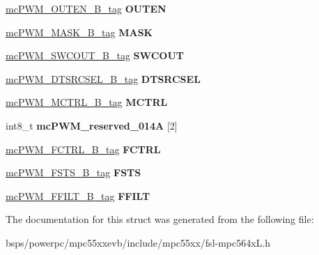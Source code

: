 \begin{DoxyCompactItemize}
\begin{tabbing}
\end{tabbing}\item 
\mbox{\label{structmcPWM__struct__tag_ae2bf17dbd74b854e60cd3dc3db4a5676}} 
\mbox{\hyperlink{unionmcPWM__OUTEN__16B__tag}{mc\+P\+W\+M\+\_\+\+O\+U\+T\+E\+N\+\_\+B\+\_\+tag}} {\bfseries O\+U\+T\+EN}
\item 
\mbox{\label{structmcPWM__struct__tag_a1a2abee4df185d8a016b06ce2971d1ea}} 
\mbox{\hyperlink{unionmcPWM__MASK__16B__tag}{mc\+P\+W\+M\+\_\+\+M\+A\+S\+K\+\_\+B\+\_\+tag}} {\bfseries M\+A\+SK}
\item 
\mbox{\label{structmcPWM__struct__tag_aa23d30471a0997e8ae2674ade1169375}} 
\mbox{\hyperlink{unionmcPWM__SWCOUT__16B__tag}{mc\+P\+W\+M\+\_\+\+S\+W\+C\+O\+U\+T\+\_\+B\+\_\+tag}} {\bfseries S\+W\+C\+O\+UT}
\item 
\mbox{\label{structmcPWM__struct__tag_a5839e29a4f5dd83b5464e1ab6d1b8a1e}} 
\mbox{\hyperlink{unionmcPWM__DTSRCSEL__16B__tag}{mc\+P\+W\+M\+\_\+\+D\+T\+S\+R\+C\+S\+E\+L\+\_\+B\+\_\+tag}} {\bfseries D\+T\+S\+R\+C\+S\+EL}
\item 
\mbox{\label{structmcPWM__struct__tag_afeedea5e1d9727884944d54446654329}} 
\mbox{\hyperlink{unionmcPWM__MCTRL__16B__tag}{mc\+P\+W\+M\+\_\+\+M\+C\+T\+R\+L\+\_\+B\+\_\+tag}} {\bfseries M\+C\+T\+RL}
\item 
\mbox{\label{structmcPWM__struct__tag_a6406f85ce5ad15ae52c23292ac5412d3}} 
int8\+\_\+t {\bfseries mc\+P\+W\+M\+\_\+reserved\+\_\+014A} \mbox{[}2\mbox{]}
\item 
\mbox{\label{structmcPWM__struct__tag_a92dda4db292b2823101d4ec4fb6a5318}} 
\mbox{\hyperlink{unionmcPWM__FCTRL__16B__tag}{mc\+P\+W\+M\+\_\+\+F\+C\+T\+R\+L\+\_\+B\+\_\+tag}} {\bfseries F\+C\+T\+RL}
\item 
\mbox{\label{structmcPWM__struct__tag_ab5845af0e60fecc340bbd905752eda11}} 
\mbox{\hyperlink{unionmcPWM__FSTS__16B__tag}{mc\+P\+W\+M\+\_\+\+F\+S\+T\+S\+\_\+B\+\_\+tag}} {\bfseries F\+S\+TS}
\item 
\mbox{\label{structmcPWM__struct__tag_a0a865ae8277a11be28b36a531b82f3d4}} 
\mbox{\hyperlink{unionmcPWM__FFILT__16B__tag}{mc\+P\+W\+M\+\_\+\+F\+F\+I\+L\+T\+\_\+B\+\_\+tag}} {\bfseries F\+F\+I\+LT}
\end{DoxyCompactItemize}


The documentation for this struct was generated from the following file\+:\begin{DoxyCompactItemize}
\item 
bsps/powerpc/mpc55xxevb/include/mpc55xx/fsl-\/mpc564x\+L.\+h\end{DoxyCompactItemize}
